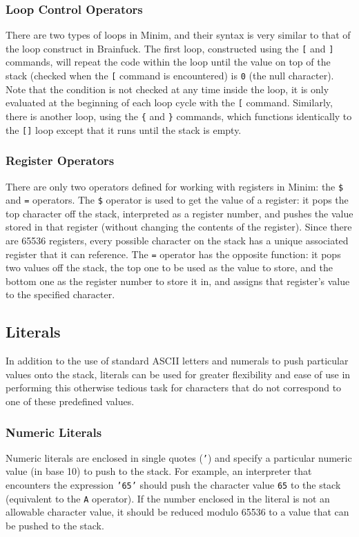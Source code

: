 \documentclass{article}
\begin{document}
\subsubsection{Loop Control Operators}
There are two types of loops in Minim, and their syntax is very similar to that of the loop construct in Brainfuck. The first loop, constructed using the \texttt{[} and \texttt{]} commands, will repeat the code within the loop until the value on top of the stack (checked when the \texttt{[} command is encountered) is \texttt{0} (the null character). Note that the condition is not checked at any time inside the loop, it is only evaluated at the beginning of each loop cycle with the \texttt{[} command. Similarly, there is another loop, using the \texttt{\{} and \texttt{\}} commands, which functions identically to the \texttt{[]} loop except that it runs until the stack is empty.
\subsubsection{Register Operators}
There are only two operators defined for working with registers in Minim: the \texttt{\$} and \texttt{=} operators. The \texttt{\$} operator is used to get the value of a register: it pops the top character off the stack, interpreted as a register number, and pushes the value stored in that register (without changing the contents of the register). Since there are 65536 registers, every possible character on the stack has a unique associated register that it can reference. The \texttt{=} operator has the opposite function: it pops two values off the stack, the top one to be used as the value to store, and the bottom one as the register number to store it in, and assigns that register's value to the specified character.
\subsection{Literals}
In addition to the use of standard ASCII letters and numerals to push particular values onto the stack, literals can be used for greater flexibility and ease of use in performing this otherwise tedious task for characters that do not correspond to one of these predefined values.
\subsubsection{Numeric Literals}
Numeric literals are enclosed in single quotes (\texttt{'}) and specify a particular numeric value (in base 10) to push to the stack. For example, an interpreter that encounters the expression \texttt{'65'} should push the character value \texttt{65} to the stack (equivalent to the \texttt{A} operator). If the number enclosed in the literal is not an allowable character value, it should be reduced modulo 65536 to a value that can be pushed to the stack.
\end{document}
